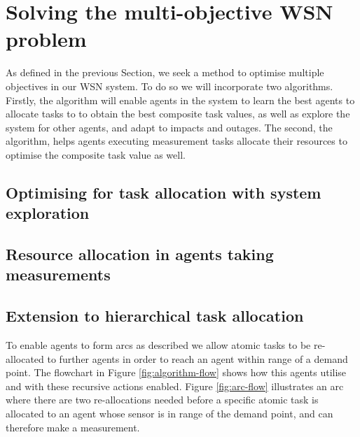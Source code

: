 \section{Solving the multi-objective WSN problem}
\label{section:solution}
As defined in the previous Section, we seek a method to optimise multiple objectives in our WSN system. To do so we will incorporate two algorithms. Firstly, the \acronymATARIAExtended{}{} algorithm will enable agents in the system to learn the best agents to allocate tasks to to obtain the best composite task values, as well as explore the system for other agents, and adapt to impacts and outages. The second, the \acronymMGRAOExtended{}{} algorithm, helps agents executing measurement tasks allocate their resources to optimise the composite task value as well.


\newcommand{\formalATARIA}[2]{
	\functionFormal{ataria}
	{XXX}
	{\powerSetAgents{}{} \times \powerSetAgents{}{} \times (\setAction{}{} \times \setRealNumbers{}{})}
}

\subsection{Optimising for task allocation with system exploration}

\subsection{Resource allocation in agents taking measurements}

\subsection{Extension to hierarchical task allocation}

To enable agents to form arcs as described we allow atomic tasks to be re-allocated to further agents in order to reach an agent within range of a demand point. The flowchart in Figure \ref{fig:algorithm-flow} shows how this agents utilise \acronymATARIA{}{} and \acronymMGRAO{}{} with these recursive actions enabled. Figure \ref{fig:arc-flow} illustrates an arc where there are two re-allocations needed before a specific atomic task is allocated to an agent whose sensor is in range of the demand point, and can therefore make a measurement.

